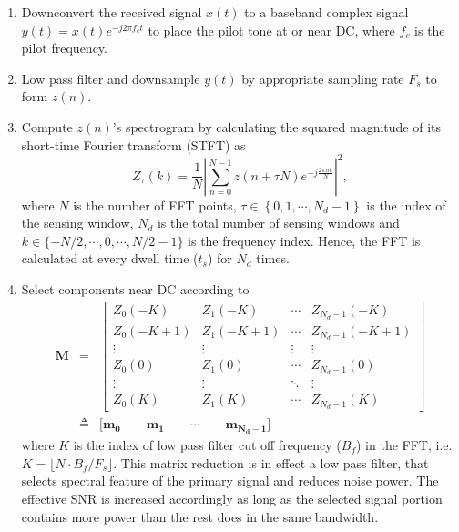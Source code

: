 \documentclass[draftclsnofoot,onecolumn,12pt]{IEEEtran}
\begin{document}
    \begin{enumerate}
      \item Downconvert the received signal $x(t)$ to a baseband complex signal $y(t) = x(t)e^{-j2\pi f_c t}$
to place the pilot tone at or near DC, where $f_c$ is the pilot frequency.
      \item Low pass filter and downsample $y(t)$ by appropriate sampling rate $F_s$ to form
      $z(n)$. \item Compute $z(n)$'s spectrogram by calculating the squared magnitude of its short-time Fourier transform (STFT) as
      \begin{equation}
        Z_\tau(k) = \frac{1}{N}\left|\sum_{n=0}^{N-1} z(n + \tau N)e^{-j\frac{2\pi nk}{N}}\right|^2,
      \end{equation}
where $N$ is the number of FFT points,
	 $\tau \in \left\{0, 1, \cdots, N_d-1\right\}$ is the index of the sensing window, $N_d$ is the total number of sensing windows
	 and $k \in \{-N/2, \cdots, 0, \cdots, N/2-1\}$ is the frequency index.
Hence, the FFT is calculated at every dwell time ($t_s$) for $N_d$ times. \item Select components near DC according to \begin{eqnarray}
              \mathbf{M} &=& \left[\begin{array}{cccc}
                  Z_0(-K) & Z_1(-K) & \cdots & Z_{N_d-1}(-K)\\
                  Z_0(-K+1) & Z_1(-K+1) & \cdots & Z_{N_d-1}(-K+1)\\
                  \vdots & \vdots & \vdots & \vdots\\
                  Z_0(0) & Z_1(0) & \cdots & Z_{N_d-1}(0)\\
                  \vdots & \vdots & \ddots & \vdots\\
                  Z_0(K) & Z_1(K) & \cdots & Z_{N_d-1}(K)
                  \end{array} \right]\\
                 &\triangleq& \big[\mathbf{m_0} \qquad \mathbf{m_1} \qquad  \cdots \qquad  \mathbf{m_{N_d-1}} \big]
          \end{eqnarray}
          where $K$ is the index of low pass filter cut off
          frequency ($B_f$) in the FFT, i.e. $K = \lfloor N \cdot B_f/F_s \rfloor$.
This matrix reduction is in effect a low pass filter, that selects spectral feature of the primary signal and reduces noise power.
	  The effective SNR is increased accordingly as long as the selected signal portion contains more power than the rest does in the same bandwidth.

\end{enumerate}
\end{document}
